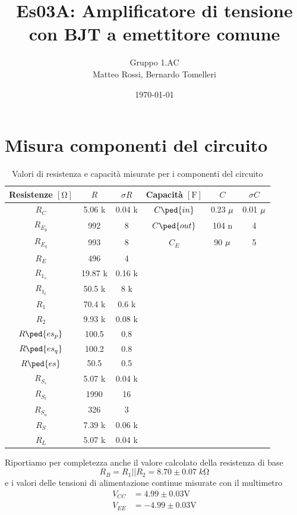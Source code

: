 \documentclass[10pt,a4paper]{article}
\author{Gruppo 1.AC \\ Matteo Rossi, Bernardo Tomelleri}
\title{Es03A: Amplificatore di tensione con BJT a emettitore comune}
\begin{document}
\date{\today}
\maketitle

\setcounter{section}{0}

\section*{Misura componenti del circuito}
\begin{table}[ht]
\centering
\begin{tabular}{cccccc}
\toprule
Resistenze $[\si{\ohm}]$ & $R$ & $\sigma R$ & Capacità $[\si{\F}]$ & $C$ &
$\sigma C$ \\
\midrule
\midrule
$R_C$		  & 5.06 k	& 0.04 k & $C\ped{in}$  & 0.23 $\rm \mu$ & 0.01 $\rm \mu$ \\
$R_{E_p}$	  & 992		& 8      & $C\ped{out}$ & 104 n			 & 4	\\
$R_{E_q}$	  & 993		& 8      & $C_E$        & 90 $\rm \mu$	 & 5	\\
$R_{E}$		  & 496		& 4      &              &				 &		\\
$R_{1_s}$	  & 19.87 k & 0.16 k &              &				 &		\\
$R_{1_t}$	  & 50.5 k  & 8 k	 &              &				 &		\\
$R_1$		  & 70.4 k  & 0.6 k	 &              &				 &		\\
$R_2$		  & 9.93 k  & 0.08 k &              &				 &		\\
$R\ped{es_p}$ & 100.5	& 0.8    &				&				 &		\\
$R\ped{es_q}$ & 100.2	& 0.8    &				&				 &		\\
$R\ped{es}$   & 50.5	& 0.5    &				&				 &		\\
$R_{S_s}$	  & 5.07 k	& 0.04 k &				&				 &		\\
$R_{S_t}$     & 1990	& 16	 &				&				 &		\\
$R_{S_u}$	  & 326		& 3		 &				&				 &		\\
$R_{S}$		  & 7.39 k	& 0.06 k &				&				 &		\\
$R_{L}$		  & 5.07 k	& 0.04 k &				&				 &		\\
\bottomrule     
\end{tabular}
\caption{Valori di resistenza e capacità misurate per i componenti del
circuito \label{tab: rcmes}}
\end{table}
Riportiamo per completezza anche il valore calcolato della resistenza di base
\[
R_B = R_1 || R_2 = 8.70 \pm 0.07 \; \si{k\ohm}
\]
e i valori delle tensioni di alimentazione continue misurate con il multimetro
\begin{align*}
V_{CC} &= 4.99 \pm 0.03 \si{\V} \\
V_{EE} &= -4.99 \pm 0.03 \si{\V}
\end{align*}
\end{document}
